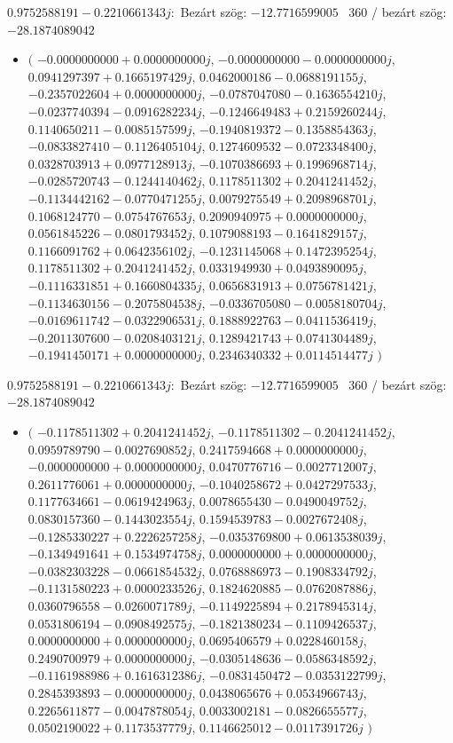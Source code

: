 \documentclass[14pt,a4paper]{article}
\begin{document}
$0.9752588191-0.2210661343j$:\
Bezárt szög: $-12.7716599005$ \
360 / bezárt szög: $-28.1874089042$\
\begin{itemize}
\item
$\big($
$-0.0000000000+0.0000000000j$, $-0.0000000000-0.0000000000j$, $0.0941297397+0.1665197429j$, $0.0462000186-0.0688191155j$, $-0.2357022604+0.0000000000j$, $-0.0787047080-0.1636554210j$, $-0.0237740394-0.0916282234j$, $-0.1246649483+0.2159260244j$, $0.1140650211-0.0085157599j$, $-0.1940819372-0.1358854363j$, $-0.0833827410-0.1126405104j$, $0.1274609532-0.0723348400j$, $0.0328703913+0.0977128913j$, $-0.1070386693+0.1996968714j$, $-0.0285720743-0.1244140462j$, $0.1178511302+0.2041241452j$, $-0.1134442162-0.0770471255j$, $0.0079275549+0.2098968701j$, $0.1068124770-0.0754767653j$, $0.2090940975+0.0000000000j$, $0.0561845226-0.0801793452j$, $0.1079088193-0.1641829157j$, $0.1166091762+0.0642356102j$, $-0.1231145068+0.1472395254j$, $0.1178511302+0.2041241452j$, $0.0331949930+0.0493890095j$, $-0.1116331851+0.1660804335j$, $0.0656831913+0.0756781421j$, $-0.1134630156-0.2075804538j$, $-0.0336705080-0.0058180704j$, $-0.0169611742-0.0322906531j$, $0.1888922763-0.0411536419j$, $-0.2011307600-0.0208403121j$, $0.1289421743+0.0741304489j$, $-0.1941450171+0.0000000000j$, $0.2346340332+0.0114514477j$
$\big)$
\end{itemize}
$0.9752588191-0.2210661343j$:\
Bezárt szög: $-12.7716599005$ \
360 / bezárt szög: $-28.1874089042$\
\begin{itemize}
\item
$\big($
$-0.1178511302+0.2041241452j$, $-0.1178511302-0.2041241452j$, $0.0959789790-0.0027690852j$, $0.2417594668+0.0000000000j$, $-0.0000000000+0.0000000000j$, $0.0470776716-0.0027712007j$, $0.2611776061+0.0000000000j$, $-0.1040258672+0.0427297533j$, $0.1177634661-0.0619424963j$, $0.0078655430-0.0490049752j$, $0.0830157360-0.1443023554j$, $0.1594539783-0.0027672408j$, $-0.1285330227+0.2226257258j$, $-0.0353769800+0.0613538039j$, $-0.1349491641+0.1534974758j$, $0.0000000000+0.0000000000j$, $-0.0382303228-0.0661854532j$, $0.0768886973-0.1908334792j$, $-0.1131580223+0.0000233526j$, $0.1824620885-0.0762087886j$, $0.0360796558-0.0260071789j$, $-0.1149225894+0.2178945314j$, $0.0531806194-0.0908492575j$, $-0.1821380234-0.1109426537j$, $0.0000000000+0.0000000000j$, $0.0695406579+0.0228460158j$, $0.2490700979+0.0000000000j$, $-0.0305148636-0.0586348592j$, $-0.1161988986+0.1616312386j$, $-0.0831450472-0.0353122799j$, $0.2845393893-0.0000000000j$, $0.0438065676+0.0534966743j$, $0.2265611877-0.0047878054j$, $0.0033002181-0.0826655577j$, $0.0502190022+0.1173537779j$, $0.1146625012-0.0117391726j$
$\big)$
\end{itemize}
\end{document}
